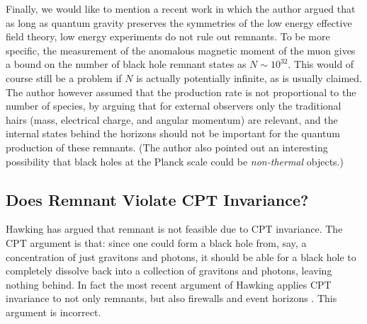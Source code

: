 \documentclass[12pt]{article}
\newcommand{\2}{$^2$}
\newcommand{\3}{$^3$}
\newcommand{\4}{$_4$}
\newcommand{\5}{$_5$}
\begin{document}
Finally, we would like to mention a recent work \cite{xavier} in which the author argued that as long as quantum
gravity preserves the symmetries of the low energy effective field theory, low energy experiments do not rule out remnants. To be more specific, the measurement of the anomalous magnetic moment of the muon gives a bound on the number of black hole remnant states as $N\sim 10^{32}$. This would of course still be a problem if $N$ is actually potentially infinite, as is usually claimed. The author however assumed that the production rate is not proportional to the number of species, by arguing that for external observers only the traditional hairs (mass, electrical charge, and angular momentum) are relevant, and the internal states behind the horizons should not be important for the quantum production of these remnants. (The author also pointed out an interesting possibility that black holes at the Planck scale could be \emph{non-thermal} objects.)

\subsection{Does Remnant Violate CPT Invariance?}

Hawking has argued that remnant is not feasible due to CPT invariance. The CPT argument is that: since one could form a black hole from, say, a concentration of just gravitons and photons, it should be able for a black hole to completely dissolve back into a collection of gravitons and photons, leaving nothing behind. In fact the most recent argument of Hawking applies CPT invariance to not only remnants, but also firewalls and event horizons \cite{1401.5761}. This argument is incorrect. 
\end{document}
